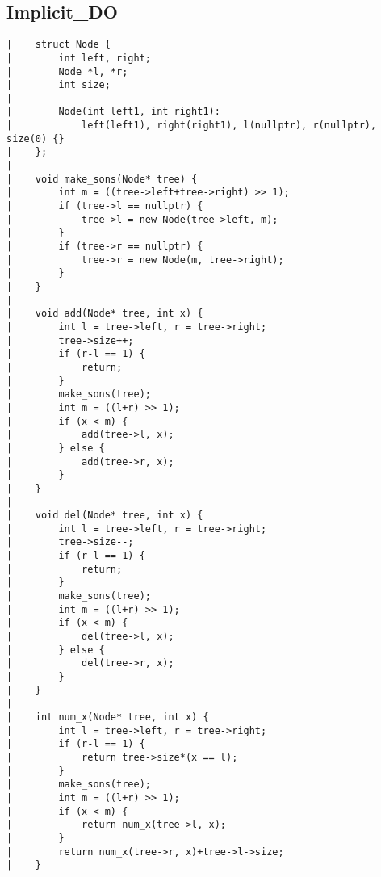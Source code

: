 \documentclass[a4paper, 10pt]{article}
\begin{document}
\begin{center}
\section*{Implicit\_DO}
\begin{verbatim}
|    struct Node {
|        int left, right;
|        Node *l, *r;
|        int size;
|    
|        Node(int left1, int right1):
|            left(left1), right(right1), l(nullptr), r(nullptr), size(0) {}
|    };
|    
|    void make_sons(Node* tree) {
|        int m = ((tree->left+tree->right) >> 1);
|        if (tree->l == nullptr) {
|            tree->l = new Node(tree->left, m);
|        }
|        if (tree->r == nullptr) {
|            tree->r = new Node(m, tree->right);
|        }
|    }
|    
|    void add(Node* tree, int x) {
|        int l = tree->left, r = tree->right;
|        tree->size++;
|        if (r-l == 1) {
|            return;
|        }
|        make_sons(tree);
|        int m = ((l+r) >> 1);
|        if (x < m) {
|            add(tree->l, x);
|        } else {
|            add(tree->r, x);
|        }
|    }
|    
|    void del(Node* tree, int x) {
|        int l = tree->left, r = tree->right;
|        tree->size--;
|        if (r-l == 1) {
|            return;
|        }
|        make_sons(tree);
|        int m = ((l+r) >> 1);
|        if (x < m) {
|            del(tree->l, x);
|        } else {
|            del(tree->r, x);
|        }
|    }
|    
|    int num_x(Node* tree, int x) {
|        int l = tree->left, r = tree->right;
|        if (r-l == 1) {
|            return tree->size*(x == l);
|        }
|        make_sons(tree);
|        int m = ((l+r) >> 1);
|        if (x < m) {
|            return num_x(tree->l, x);
|        }
|        return num_x(tree->r, x)+tree->l->size;
|    }
\end{verbatim}


\end{center}
\end{document}
